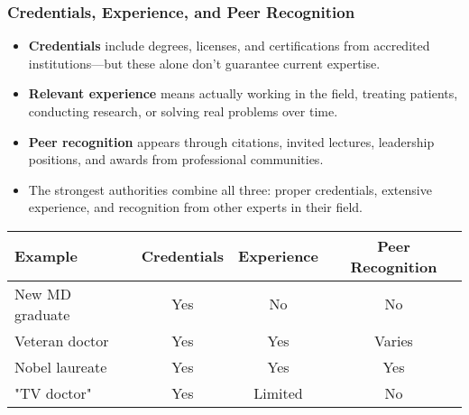 \documentclass{beamer}
\begin{document}
	\begin{frame}
		\frametitle{Credentials, Experience, and Peer Recognition}
		\begin{itemize}
			\item \textbf{Credentials} include degrees, licenses, and certifications from accredited institutions—but these alone don't guarantee current expertise.
			\item \textbf{Relevant experience} means actually working in the field, treating patients, conducting research, or solving real problems over time.
			\item \textbf{Peer recognition} appears through citations, invited lectures, leadership positions, and awards from professional communities.
			\item The strongest authorities combine all three: proper credentials, extensive experience, and recognition from other experts in their field.
		\end{itemize}
		
		\begin{table}
			\centering
			\small
			\begin{tabular}{|l|c|c|c|}
				\hline
				\textbf{Example} & \textbf{Credentials} & \textbf{Experience} & \textbf{Peer Recognition} \\
				\hline
				New MD graduate & Yes & No & No \\
				Veteran doctor & Yes & Yes & Varies \\
				Nobel laureate & Yes & Yes & Yes \\
				"TV doctor" & Yes & Limited & No \\
				\hline
			\end{tabular}
		\end{table}
	\end{frame}
	
\end{document}

